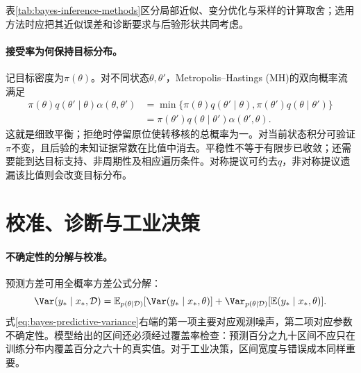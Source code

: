 \begin{table}[htbp]
\centering
\caption{贝叶斯推断方法的工程取舍}
\label{tab:bayes-inference-methods}
\scriptsize
\setlength{\tabcolsep}{3pt}
\end{table}

表\ref{tab:bayes-inference-methods}区分局部近似、变分优化与采样的计算取舍；选用方法时应把其近似误差和诊断要求与后验形状共同考虑。
\paragraph{接受率为何保持目标分布。}
记目标密度为$\pi(\theta)$。对不同状态$\theta,\theta'$，Metropolis--Hastings (MH)的双向概率流满足
\begin{align}
 \pi(\theta)q(\theta'\mid\theta)\alpha(\theta,\theta')
 &=\min\{\pi(\theta)q(\theta'\mid\theta),
          \pi(\theta')q(\theta\mid\theta')\}\\
 &=\pi(\theta')q(\theta\mid\theta')\alpha(\theta',\theta).
\end{align}
这就是细致平衡；拒绝时停留原位使转移核的总概率为一。对当前状态积分可验证$\pi$不变，且后验的未知证据常数在比值中消去。平稳性不等于有限步已收敛；还需要能到达目标支持、非周期性及相应遍历条件。对称提议可约去$q$，非对称提议遗漏该比值则会改变目标分布。

\section{校准、诊断与工业决策}
\paragraph{不确定性的分解与校准。}
预测方差可用全概率方差公式分解：
\begin{equation}
 \Var(y_*\mid x_*,\mathcal D)=\mathbb E_{p(\theta\mid\mathcal D)}[\Var(y_*\mid x_*,\theta)]
 +\Var_{p(\theta\mid\mathcal D)}[\mathbb E(y_*\mid x_*,\theta)].\label{eq:bayes-predictive-variance}
\end{equation}
式\eqref{eq:bayes-predictive-variance}右端的第一项主要对应观测噪声，第二项对应参数不确定性。模型给出的区间还必须经过覆盖率检查：预测百分之九十区间不应只在训练分布内覆盖百分之六十的真实值。对于工业决策，区间宽度与错误成本同样重要。

